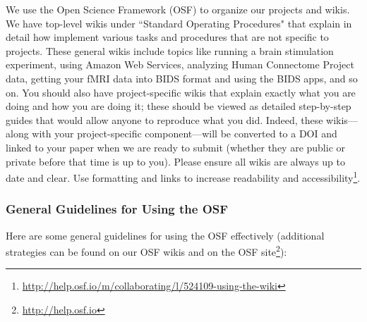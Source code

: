 \documentclass[letterpaper,12pt,oneside]{memoir}
\begin{document}
We use the Open Science Framework (OSF) to organize our projects and wikis. We have top-level wikis under ``Standard Operating Procedures" that explain in detail how implement various tasks and procedures that are not specific to projects. These general wikis include topics like running a brain stimulation experiment, using Amazon Web Services, analyzing Human Connectome Project data, getting your fMRI data into BIDS format and using the BIDS apps, and so on. You should also have project-specific wikis that explain exactly what you are doing and how you are doing it; these should be viewed as detailed step-by-step guides that would allow anyone to reproduce what you did. Indeed, these wikis---along with your project-specific component---will be converted to a DOI and linked to your paper when we are ready to submit (whether they are public or private before that time is up to you). Please ensure all wikis are always up to date and clear. Use formatting and links to increase readability and accessibility\footnote{\url{http://help.osf.io/m/collaborating/l/524109-using-the-wiki}}.

\subsubsection{General Guidelines for Using the OSF}

Here are some general guidelines for using the OSF effectively (additional strategies can be found on our OSF wikis and on the OSF site\footnote{\url{http://help.osf.io}}):
\end{document}
